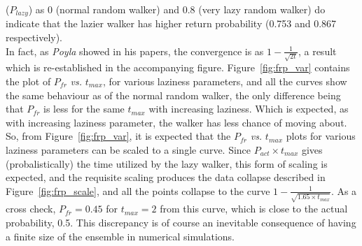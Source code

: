 \documentclass[12pt]{article}
\begin{document}
\begin{enumerate}[I.]
($P_{lazy}$) as 0 (normal random walker) and 0.8 (very lazy random walker) do indicate that the lazier walker has higher return probability (0.753 and 0.867 respectively). \\
In fact, as \emph{Poyla} showed in his papers, the convergence is as $1-\frac{1}{\sqrt{2t}}$, a result which is re-established in the accompanying figure. Figure~\ref{fig:frp_var} contains the plot of $P_{fr}$ \emph{vs.} $t_{max}$, for various laziness parameters, and all the curves show the same behaviour as of the normal random walker, the only difference being that $P_{fr}$ is less for the same $t_{max}$ with increasing laziness. Which is expected, as with increasing laziness parameter, the walker has less chance of moving about. So, from Figure~\ref{fig:frp_var}, it is expected that the $P_{fr}$ \emph{vs.} $t_{max}$ plots for various laziness parameters can be scaled to a single curve. Since $P_{act}\times t_{max}$ gives (probalistically) the time utilized by the lazy walker, this form of scaling is expected, and the requisite scaling produces the data collapse described in Figure~\ref{fig:frp_scale}, and all the points collapse to the curve $1-\frac{1}{\sqrt{1.65\times t_{max}}}$. As a cross check, $P_{fr}=0.45$ for $t_{max}=2$ from this curve, which is close to the actual probability, 0.5. This discrepancy is of course an inevitable consequence of having a finite size of the ensemble in numerical simulations.

\end{enumerate}
\end{document}
